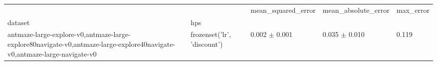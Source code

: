 \begin{tabular}{lllll}
\toprule
 &  & mean_squared_error & mean_absolute_error & max_error \\
dataset & hps &  &  &  \\
\midrule
antmaze-large-explore-v0,antmaze-large-explore80navigate-v0,antmaze-large-explore40navigate-v0,antmaze-large-navigate-v0 & frozenset({'lr', 'discount'}) & 0.002 $\pm$ 0.001 & 0.035 $\pm$ 0.010 & 0.119 \\
\cline{1-5}
\bottomrule
\end{tabular}
